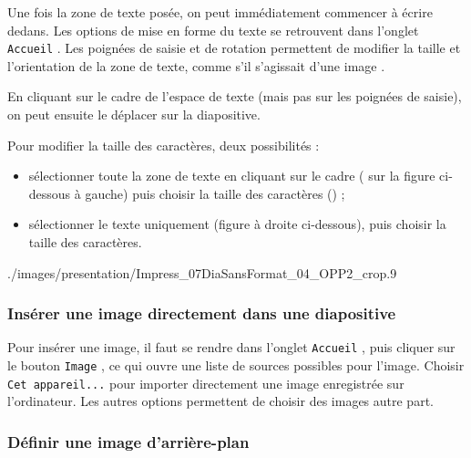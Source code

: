 Une fois la zone de texte posée, on peut immédiatement commencer à écrire dedans. Les options de mise en forme du texte se retrouvent dans l'onglet \texttt{Accueil} . Les poignées de saisie et de rotation permettent de modifier la taille et l'orientation de la zone de texte, comme s'il s'agissait d'une image .


\vspace{1em}

En cliquant sur le cadre de l'espace de texte (mais pas sur les poignées de saisie), on peut ensuite le déplacer sur la diapositive. 

\vspace{1em}

Pour modifier la taille des caractères, deux possibilités :
\begin{itemize}
\item sélectionner toute la zone de texte en cliquant sur le cadre ( sur la figure ci-dessous à gauche) puis choisir la taille des caractères () ; 
\item sélectionner le texte uniquement (figure à droite ci-dessous), puis choisir la taille des caractères.
\end{itemize}

	      {./images/presentation/Impress_07DiaSansFormat_04_OPP2_crop}{.9\textwidth}


\subsubsection{Insérer une image directement dans une diapositive}\label{Presentation1image}

Pour insérer une image, il faut se rendre dans l'onglet \texttt{Accueil} , puis cliquer sur le bouton \texttt{Image} , ce qui ouvre une liste de sources possibles pour l'image. Choisir \texttt{Cet appareil...}  pour importer directement une image enregistrée sur l'ordinateur. Les autres options permettent de choisir des images autre part.




\subsubsection{Définir une image d'arrière-plan}\label{Presentation1imageFond}

